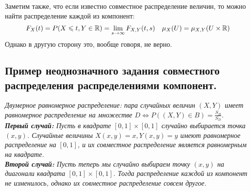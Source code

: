 Заметим также, что если известно совместное распределение величин, то можно найти распределение каждой из компонент:
\begin{align*}
    &F_X(t) = P(X \leqslant t, Y \in \mathbb{R}) = \lim\limits_{s \to \infty} F_{X, Y}(t, s)
    &\mu_X(U) = \mu_{X, Y}(U \times \mathbb{R})
\end{align*}
Однако в другую сторону это, вообще говоря, не верно.

\subsection{Пример неоднозначного задания совместного распределения распределениями компонент.}
\it{Двумерное равномерное распределение:} пара случайных величин $(X, Y)$ имеет равномерное распределение на множестве
$D \iff P((X, Y) \in B) = \frac{S_B}{S_D}$.
\\
\textbf{Первый случай:}
Пусть в квадрате $[0, 1] \times [0, 1]$ случайно выбирается точка $(x, y)$. Случайные величины $X(x, y) = x,
Y(x, y) = y$ имеют равномерное распределение на $[0, 1]$, и их совместное распределение является равномерным на квадрате.\\
\textbf{Второй случай:}
Пусть теперь мы случайно выбираем точку $(x, y)$ на диагонали квадрата $[0, 1] \times [0, 1]$. Тогда распределение каждой из
компонент не изменилось, однако их совместное распределение совсем другое.
